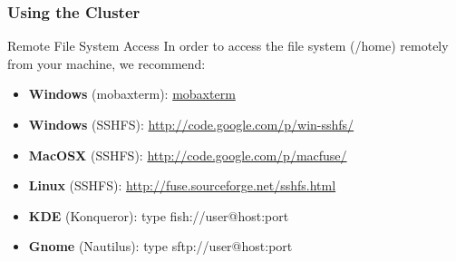\documentclass{beamer}
\begin{document}
\begin{frame}[fragile]
  \frametitle{Using the Cluster}
      \begin{block}{Remote File System Access}
       In order to access the file system (/home) remotely from your machine, we recommend:
        \begin{itemize}
        \item \textbf{Windows} (mobaxterm): \href{http://mobaxterm.mobatek.net/}{mobaxterm}
        \item \textbf{Windows} (SSHFS): \url{http://code.google.com/p/win-sshfs/}
        \item \textbf{MacOSX} (SSHFS): \url{http://code.google.com/p/macfuse/}
        \item \textbf{Linux} (SSHFS): \url{http://fuse.sourceforge.net/sshfs.html}
        \item \textbf{KDE} (Konqueror): type fish://user@host:port
        \item \textbf{Gnome} (Nautilus): type sftp://user@host:port
      \end{itemize}
      \end{block}
\end{frame}

\end{document}
